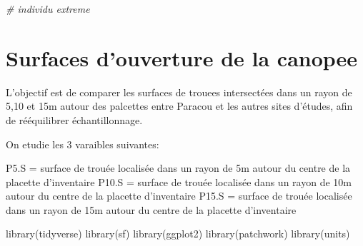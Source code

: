\documentclass[
  12pt,
  american,
  a4paper,
  extrafontsizes,onecolumn,openright
  ]{memoir}
\newenvironment{Shaded}{\begin{snugshade}}{\end{snugshade}}
\newcommand{\CommentTok}[1]{\textcolor[rgb]{0.56,0.35,0.01}{\textit{#1}}}
\newcommand{\FunctionTok}[1]{\textcolor[rgb]{0.00,0.00,0.00}{#1}}
\newcommand{\NormalTok}[1]{#1}
\newlength{\rf}
\begin{document}
\begin{Shaded}
\begin{Highlighting}[]
\CommentTok{\# individu extreme }
\end{Highlighting}
\end{Shaded}

\normalsize

\hypertarget{surfaces-douverture-de-la-canopee}{%
\chapter{Surfaces d'ouverture de la canopee}\label{surfaces-douverture-de-la-canopee}}

L'objectif est de comparer les surfaces de trouees intersectées dans un rayon de 5,10 et 15m autour des palcettes entre Paracou et les autres sites d'études, afin de rééquilibrer échantillonnage.

On etudie les 3 varaibles suivantes:

P5.S = surface de trouée localisée dans un rayon de 5m autour du centre de la placette d'inventaire
P10.S = surface de trouée localisée dans un rayon de 10m autour du centre de la placette d'inventaire
P15.S = surface de trouée localisée dans un rayon de 15m autour du centre de la placette d'inventaire

\scriptsize

\begin{Shaded}
\begin{Highlighting}[]
\FunctionTok{library}\NormalTok{(tidyverse)}
\FunctionTok{library}\NormalTok{(sf)}
\FunctionTok{library}\NormalTok{(ggplot2)}
\FunctionTok{library}\NormalTok{(patchwork)}
\FunctionTok{library}\NormalTok{(units)}
\end{Highlighting}
\end{Shaded}

\normalsize

\scriptsize
\end{document}
